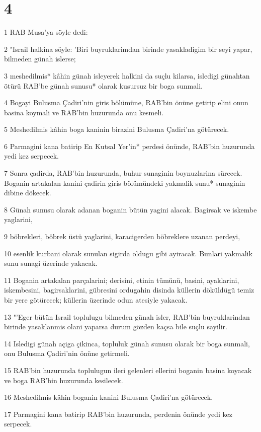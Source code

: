 \chapter{4}

\par 1 RAB Musa'ya söyle dedi:
\par 2 "Israil halkina söyle: 'Biri buyruklarimdan birinde yasakladigim bir seyi yapar, bilmeden günah islerse;
\par 3 meshedilmis* kâhin günah isleyerek halkini da suçlu kilarsa, isledigi günahtan ötürü RAB'be günah sunusu* olarak kusursuz bir boga sunmali.
\par 4 Bogayi Bulusma Çadiri'nin giris bölümüne, RAB'bin önüne getirip elini onun basina koymali ve RAB'bin huzurunda onu kesmeli.
\par 5 Meshedilmis kâhin boga kaninin birazini Bulusma Çadiri'na götürecek.
\par 6 Parmagini kana batirip En Kutsal Yer'in* perdesi önünde, RAB'bin huzurunda yedi kez serpecek.
\par 7 Sonra çadirda, RAB'bin huzurunda, buhur sunaginin boynuzlarina sürecek. Boganin artakalan kanini çadirin giris bölümündeki yakmalik sunu* sunaginin dibine dökecek.
\par 8 Günah sunusu olarak adanan boganin bütün yagini alacak. Bagirsak ve iskembe yaglarini,
\par 9 böbrekleri, böbrek üstü yaglarini, karacigerden böbreklere uzanan perdeyi,
\par 10 esenlik kurbani olarak sunulan sigirda oldugu gibi ayiracak. Bunlari yakmalik sunu sunagi üzerinde yakacak.
\par 11 Boganin artakalan parçalarini; derisini, etinin tümünü, basini, ayaklarini, iskembesini, bagirsaklarini, gübresini ordugahin disinda küllerin döküldügü temiz bir yere götürecek; küllerin üzerinde odun atesiyle yakacak.
\par 13 "'Eger bütün Israil toplulugu bilmeden günah isler, RAB'bin buyruklarindan birinde yasaklanmis olani yaparsa durum gözden kaçsa bile suçlu sayilir.
\par 14 Isledigi günah açiga çikinca, topluluk günah sunusu olarak bir boga sunmali, onu Bulusma Çadiri'nin önüne getirmeli.
\par 15 RAB'bin huzurunda toplulugun ileri gelenleri ellerini boganin basina koyacak ve boga RAB'bin huzurunda kesilecek.
\par 16 Meshedilmis kâhin boganin kanini Bulusma Çadiri'na götürecek.
\par 17 Parmagini kana batirip RAB'bin huzurunda, perdenin önünde yedi kez serpecek.
